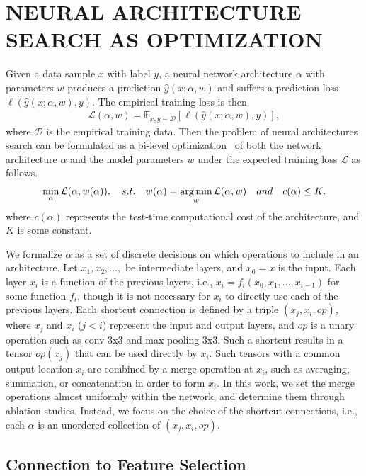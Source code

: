 \section{NEURAL ARCHITECTURE SEARCH AS OPTIMIZATION}

Given a data sample $x$ with label $y$, a neural network architecture $\alpha$ with parameters $w$ produces 
a prediction $\hat{y}(x ; \alpha, w)$ and suffers a prediction loss $\ell(\hat{y}(x ; \alpha, w), y)$.
The empirical training loss is then 
\begin{align}
\mathcal{L}(\alpha, w) = \mathbb{E} _{x, y \sim \mathcal{D}} [ \ell(\hat{y}(x ; \alpha, w), y) ] ,
\end{align}
where $\mathcal{D}$ is the empirical training data. 
Then the problem of neural architectures search can be formulated as a bi-level optimization~\citep{bilevel_opt}
of both the network architecture $\alpha$ and the model parameters $w$ under the expected training loss $\mathcal{L}$ 
as follows.
\begin{align}
\min _{\alpha} \mathcal{L} (\alpha, w(\alpha)),
\quad
s.t. \quad w(\alpha) = \operatorname*{arg\,min} _w \mathcal{L} (\alpha, w) 
\quad and \quad c(\alpha) \leq K,
\label{eq:bilevel_nas}
\end{align}
where $c(\alpha)$ represents the test-time computational cost of the architecture, and $K$ is some constant. 

We formalize $\alpha$ as a set of discrete decisions on which operations to include in an architecture.
Let $x_1, x_2,...,$ be intermediate layers, and $x_0 = x$ is the input. Each layer $x_i$ is a function
of the previous layers, i.e., $x_{i} = f_i ( x_0, x_1,..., x_{i-1})$ for some function $f_i$, 
though it is not necessary for $x_i$ to directly use each of the previous layers.
Each shortcut connection is defined by a triple $(x_{j}, x_{i}, op)$, 
where $x_j$ and $x_i$ ($j < i$) represent the input and output layers, and $op$ is a unary operation such 
as conv 3x3 and max pooling 3x3. Such a shortcut results in a tensor $op(x_{j})$ that can be used directly by 
$x_i$. Such tensors with a common output location $x_i$ are combined by a merge operation 
at $x_i$, such as averaging, summation, or concatenation in order to form $x_i$.
In this work, we set the merge operations almost uniformly within the network, 
and determine them through ablation studies. 
Instead, we focus on the choice of the shortcut connections, i.e., each $\alpha$ is 
an unordered collection of $(x_j, x_i, op)$. 


\subsection{Connection to Feature Selection}

